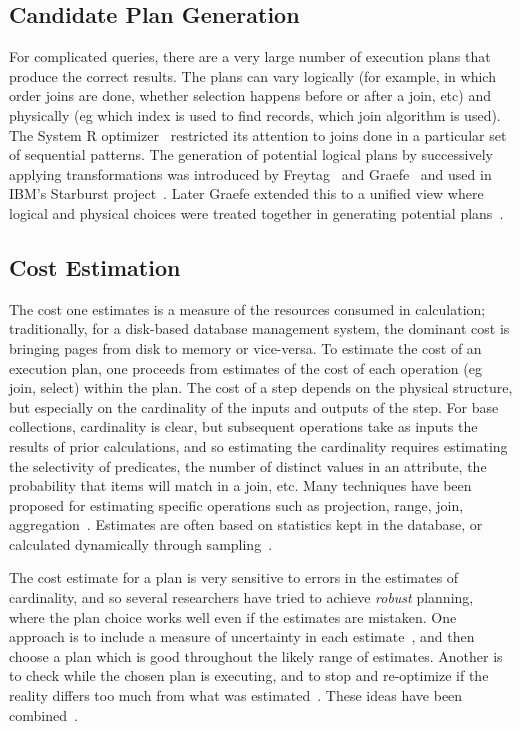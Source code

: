 \subsection{Candidate Plan Generation}
For complicated queries, there are a very large number of execution plans that produce the correct results. The plans can vary logically (for example, in which order joins are done, whether selection happens before or after a join, etc) and physically (eg which index is used to find records, which join algorithm is used). The System R optimizer~\cite{SelingerACLP79} restricted its attention to joins done in a particular set of sequential patterns. The generation of potential logical plans by successively applying transformations was introduced by Freytag~\cite{Freytag87} and Graefe~\cite{GraefeD87} and used in IBM's Starburst project~\cite{HaasFLP89, PiraheshHH92}.  Later Graefe extended this to a unified view where logical and physical choices were treated together in generating potential plans~\cite{Graefe95a}.

\subsection{Cost Estimation}
The cost one estimates is a measure of the resources consumed in calculation; traditionally, for a disk-based database management system, the dominant cost is bringing pages from disk to memory or vice-versa. To estimate the cost of an execution plan, one proceeds from estimates of the cost of each operation (eg join, select) within the plan. The cost of a step depends on the physical structure, but especially on the cardinality of the inputs and outputs of the step. For base collections, cardinality is clear, but subsequent operations take as inputs the results of prior calculations, and so estimating the cardinality requires estimating the selectivity of predicates, the number of distinct values in an attribute, the probability that items will match in a join, etc. Many techniques have been proposed for estimating specific operations such as projection, range, join, aggregation~\cite{ahad1989estimating, HaasNSS96, PoosalaIHS96, MarklMKTHS05}. Estimates are often based on statistics kept in the database, or calculated dynamically through sampling~\cite{olken1995random}.

The cost estimate for a plan is very sensitive to errors in the estimates of cardinality, and so several researchers have tried to achieve \emph{robust} planning, where the plan choice works well even if the estimates are mistaken. One approach is to include a measure of uncertainty in each estimate~\cite{babcock2005towards}, and then choose a plan which is good throughout the likely range of estimates. Another is to check while the chosen plan is executing, and to stop and re-optimize if the reality differs too much from what was estimated~\cite{markl2004robust}. These ideas have been combined~\cite{babu2005proactive}.

